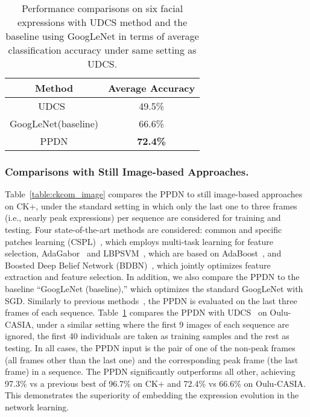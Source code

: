 \documentclass[runningheads]{llncs}
\begin{document}
\begin{table}[!tp]
	\begin{center}
		\caption{Performance comparisons on six facial expressions with UDCS method and the baseline using GoogLeNet in terms of average classification accuracy under same setting as UDCS.}
		\label{table:oulucom_image}
	
		\begin{tabular}{c|c}
		   
			\hline\noalign{\smallskip}
			Method & Average Accuracy\\			
			\hline			
            UDCS~\cite{UDCS} & 49.5\% \\
			GoogLeNet(baseline) & 66.6\% \\
			\hline
			PPDN& \textbf{72.4\%} \\
			\hline
		\end{tabular}
	\end{center}
\end{table}
\subsubsection{Comparisons with Still Image-based Approaches.}  
Table~\ref{table:ckcom_image} compares the PPDN to still image-based 
approaches on CK+, under the standard setting in which only the last
one to three frames (i.e., nearly peak expressions) per sequence are considered 
for training and testing. Four state-of-the-art methods are considered: 
common and specific patches learning (CSPL)~\cite{zhong2012learning},
which employs multi-task learning for feature selection,
AdaGabor~\cite{bartlett2005recognizing} and LBPSVM~\cite{shan2009facial},
which are based on AdaBoost~\cite{AdaBoost}, and Boosted Deep Belief 
Network (BDBN)~\cite{liu2014facial}, which jointly optimizes feature 
extraction and feature selection. In addition, we also compare the PPDN 
to the  baseline ``GoogLeNet (baseline),'' which optimizes the standard 
GoogLeNet with SGD. Similarly to previous 
methods~\cite{zhong2012learning,shan2009facial,liu2014facial},
 the PPDN is evaluated on the last three frames of each sequence. 
Table~\ref{table:oulucom_image} compares the PPDN with UDCS~\cite{UDCS} on 
Oulu-CASIA, under a similar setting where the first 9 images of each 
sequence are ignored, the first 40 individuals are taken as training samples 
and the rest as testing. In all cases, the PPDN input is the pair of one of 
the non-peak frames (all frames other than the last one) and the 
corresponding peak frame (the last frame) in a sequence. 
The PPDN significantly outperforms all other, 
achieving 97.3\% vs a previous best of 96.7\% on 
CK+ and 72.4\% vs 66.6\% on Oulu-CASIA.  This demonstrates the 
superiority of embedding the expression evolution in the network learning.
\end{document}
